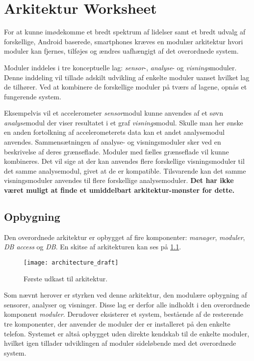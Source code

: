 \chapter{Arkitektur Worksheet}
For at kunne imødekomme et bredt spektrum af lidelser samt et bredt udvalg af forskellige, Android baserede, smartphones kræves en modulær arkitektur hvori moduler kan fjernes, tilføjes og ændres uafhængigt af det overordnede system.

Moduler inddeles i tre konceptuelle lag: \textit{sensor}-, \textit{analyse}- og \textit{visnings}moduler.
Denne inddeling vil tillade adskilt udvikling af enkelte moduler uanset hvilket lag de tilhører.
Ved at kombinere de forskellige moduler på tværs af lagene, opnås et fungerende system.

Eksempelvis vil et accelerometer \textit{sensor}modul kunne anvendes af et søvn \textit{analyse}modul der viser resultatet i et graf \textit{visnings}modul.
Skulle man her ønske en anden fortolkning af accelerometerets data kan et andet analysemodul anvendes.
Sammensætningen af analyse- og visningsmoduler sker ved en beskrivelse af deres grænseflade.
Moduler med fælles grænseflade vil kunne kombineres.
Det vil sige at der kan anvendes flere forskellige visningsmoduler til det samme analysemodul, givet at de er kompatible.
Tilsvarende kan det samme visningsmoduler anvendes til flere forskellige analysemoduler.
\textbf{Det har ikke været muligt at finde et umiddelbart arkitektur-mønster for dette.}

\section*{Opbygning}
Den overordnede arkitektur er opbygget af fire komponenter: \textit{manager}, \textit{moduler}, \textit{DB access} og \textit{DB}.
En skitse af arkitekturen kan ses på \cref{arkitektur_udkast_1}.
\begin{figure}[h]
	\texttt{[image: architecture\_draft]}
	\caption{Første udkast til arkitektur.}
  \label{arkitektur_udkast_1}
\end{figure}
Som nævnt herover er styrken ved denne arkitektur, den modulære opbygning af sensorer, analyser og visninger.
Disse lag er derfor alle indholdt i den overordnede komponent \textit{moduler}.
Derudover eksisterer et system, bestående af de resterende tre komponenter, der anvender de moduler der er installeret på den enkelte telefon.
Systemet er altså opbygget uden direkte kendskab til de enkelte moduler, hvilket igen tillader udviklingen af moduler sideløbende med det overordnede system.

